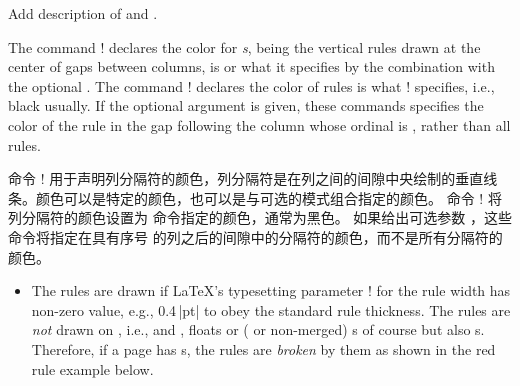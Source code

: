 \begin{description}


\item[\Midx{\!\colseprulecolor!}\oarg{mode}\marg{color}\oarg{col}]\mbox{}
\mbox{}\par
{}
{Add description of  and
    .}

The command \!\colseprulecolor! declares the color for
{\em\Uidx\cseprule{}s}, being the vertical rules drawn at the center of
gaps between columns, is  or what it specifies by the
combination with the optional .  The command
\!\normalcolseprulecolor! declares the color of rules is what
\!\normalcolor! specifies, i.e., black usually.  If the optional argument
 is given, these commands specifies the color of the rule in the
gap following the column whose ordinal is , rather than all rules.

命令 \!\colseprulecolor! 用于声明列分隔符的颜色，列分隔符是在列之间的间隙中央绘制的垂直线条。颜色可以是特定的颜色，也可以是与可选的模式组合指定的颜色。
命令 \!\normalcolseprulecolor! 将列分隔符的颜色设置为 \normalcolor 命令指定的颜色，通常为黑色。
如果给出可选参数 ，这些命令将指定在具有序号  的列之后的间隙中的分隔符的颜色，而不是所有分隔符的颜色。
\begin{itemize}
\item
The rules are drawn if \LaTeX's typesetting parameter \!\columnseprule!
for the rule width has non-zero value, e.g., 0.4\,|pt| to obey the
standard rule thickness.  The rules are \emph{not} drawn on \pwstuff{},
i.e., \Preenv{} and \postenv, \pwise{} floats or (\mgfnote{} or
non-merged) \Scfnote{}s of course but also \mctext{}s.  Therefore, if a
page has \mctext{}s, the rules are {\em broken} by them as shown in the
red rule example below.


\end{itemize}
\end{description}
